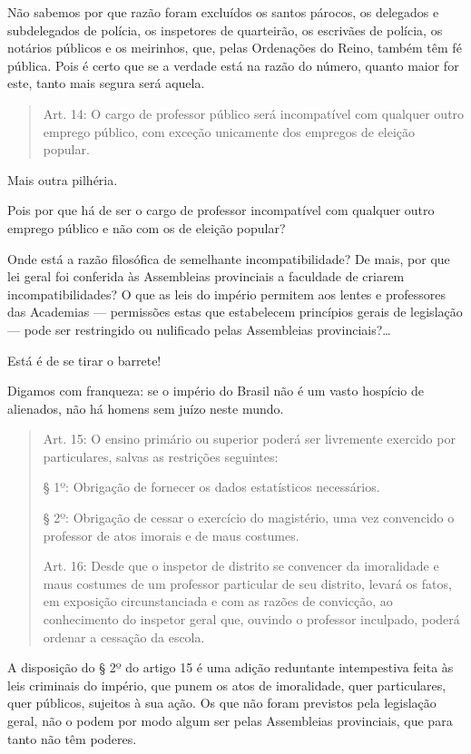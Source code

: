 Não sabemos por que razão foram excluídos os santos párocos, os
delegados e subdelegados de polícia, os inspetores de quarteirão, os
escrivães de polícia, os notários públicos e os meirinhos, que, pelas
Ordenações do Reino, também têm fé pública. Pois é certo que se a
verdade está na razão do número, quanto maior for este, tanto mais
segura será aquela.

\begin{quote}
Art. 14: O cargo de professor público será incompatível com qualquer
outro emprego público, com exceção unicamente dos empregos de eleição
popular.
\end{quote}

Mais outra pilhéria.

Pois por que há de ser o cargo de professor incompatível com qualquer
outro emprego público e não com os de eleição popular?

Onde está a razão filosófica de semelhante incompatibilidade? De mais,
por que lei geral foi conferida às Assembleias provinciais a faculdade
de criarem incompatibilidades? O que as leis do império permitem aos
lentes e professores das Academias --- permissões estas que estabelecem
princípios gerais de legislação --- pode ser restringido ou nulificado
pelas Assembleias provinciais?\ldots

Está é de se tirar o barrete!

Digamos com franqueza: se o império do Brasil não é um vasto hospício de
alienados, não há homens sem juízo neste mundo.

\begin{quote}
Art. 15: O ensino primário ou superior poderá ser livremente exercido
por particulares, salvas as restrições seguintes:

§ 1º: Obrigação de fornecer os dados estatísticos necessários.

§ 2º: Obrigação de cessar o exercício do magistério, uma vez convencido
o professor de atos imorais e de maus costumes.

Art. 16: Desde que o inspetor de distrito se convencer da imoralidade e
maus costumes de um professor particular de seu distrito, levará os
fatos, em exposição circunstanciada e com as razões de convicção, ao
conhecimento do inspetor geral que, ouvindo o professor inculpado,
poderá ordenar a cessação da escola.
\end{quote}

A disposição do § 2º do artigo 15 é uma adição reduntante intempestiva
feita às leis criminais do império, que punem os atos de imoralidade,
quer particulares, quer públicos, sujeitos à sua ação. Os que não foram
previstos pela legislação geral, não o podem por modo algum ser pelas
Assembleias provinciais, que para tanto não têm poderes.

